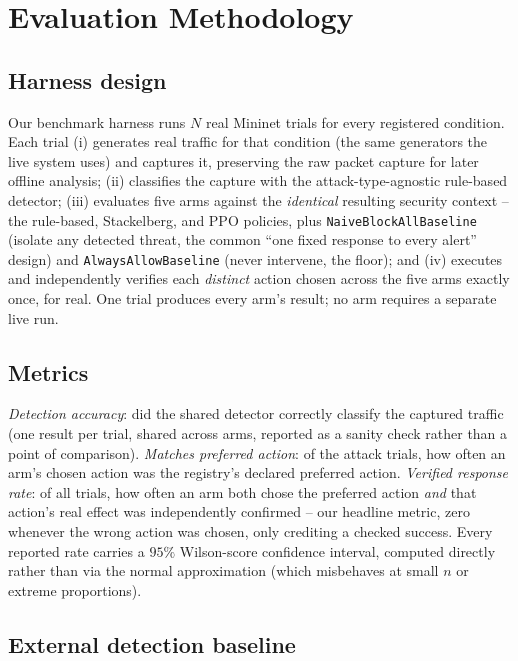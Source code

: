 \documentclass[conference]{IEEEtran}
\begin{document}
\section{Evaluation Methodology}

\subsection{Harness design}

Our benchmark harness runs $N$ real Mininet trials for every registered condition. Each trial (i)
generates real traffic for that condition (the same generators the live system uses) and captures
it, preserving the raw packet capture for later offline analysis; (ii) classifies the capture with
the attack-type-agnostic rule-based detector; (iii) evaluates five arms against the
\emph{identical} resulting security context -- the rule-based, Stackelberg, and PPO policies, plus
\texttt{NaiveBlockAllBaseline} (isolate any detected threat, the common ``one fixed response to
every alert'' design) and \texttt{AlwaysAllowBaseline} (never intervene, the floor); and (iv)
executes and independently verifies each \emph{distinct} action chosen across the five arms
exactly once, for real. One trial produces every arm's result; no arm requires a separate live
run.

\subsection{Metrics}

\emph{Detection accuracy}: did the shared detector correctly classify the captured traffic (one
result per trial, shared across arms, reported as a sanity check rather than a point of
comparison). \emph{Matches preferred action}: of the attack trials, how often an arm's chosen
action was the registry's declared preferred action. \emph{Verified response rate}: of all trials,
how often an arm both chose the preferred action \emph{and} that action's real effect was
independently confirmed -- our headline metric, zero whenever the wrong action was chosen, only
crediting a checked success. Every reported rate carries a $95\%$ Wilson-score confidence
interval, computed directly rather than via the normal approximation (which misbehaves at small
$n$ or extreme proportions).

\subsection{External detection baseline}
\end{document}
